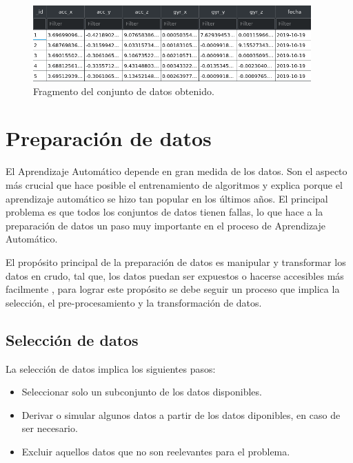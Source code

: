 \begin{figure}[h!]
  \begin{center}	\includegraphics[width=0.95\textwidth,frame]{imagenes/Cap3/dataset}
  \caption{Fragmento del conjunto de datos obtenido.}
  \label{fig:dataset}
  \end{center}
\end{figure}

\section{Preparaci\'{o}n de datos}

El Aprendizaje Autom\'{a}tico depende en gran medida de los datos. Son el aspecto m\'{a}s crucial que hace posible el entrenamiento de algoritmos y explica porque el aprendizaje autom\'{a}tico se hizo tan popular en los \'{u}ltimos a\~{n}os. El principal problema es que todos los conjuntos de datos tienen fallas, lo que hace a la preparaci\'{o}n de datos un paso muy importante en el proceso de Aprendizaje Autom\'{a}tico.

\vspace{5mm} %

El prop\'{o}sito principal de la preparaci\'{o}n de datos es manipular y transformar los datos en crudo, tal que, los datos puedan ser expuestos o hacerse accesibles m\'{a}s facilmente \cite{37}, para lograr este prop\'{o}sito se debe seguir un proceso que implica la selecci\'{o}n, el pre-procesamiento y la transformaci\'{o}n de datos.
 
\subsection{Selecci\'{o}n de datos}

La selecci\'{o}n de datos implica los siguientes pasos:

\begin{itemize}
\item Seleccionar solo un subconjunto de los datos disponibles.
\item Derivar o simular algunos datos a partir de los datos diponibles, en caso de ser necesario.
\item Excluir aquellos datos que no son reelevantes para el problema.
\end{itemize}

